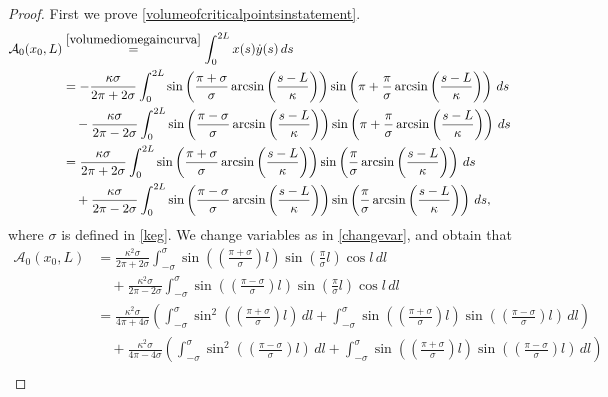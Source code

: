 \documentclass[11pt]{amsart}
\newcommand{\A}{\mathcal A}
\renewcommand{\k}{\kappa}
\theoremstyle{definition}
\theoremstyle{remark}
\numberwithin{equation}{section}
\begin{document}
\begin{proof}
First we prove \eqref{volumeofcriticalpointsinstatement}.
\begin{equation*}
	\begin{split}
		\A_0(x_0,L)&\overset{\eqref{volumediomegaincurva}}{=}\int_0^{2L} x(s)\dot y(s)\,ds\\
		&=-\frac{\k\sigma}{2\pi+2\sigma}\int_0^{2L}\sin\left(\frac{\pi+\sigma}{\sigma}\arcsin\left(\frac{s-L}{\k}\right)\right)\sin\left(\pi+\frac{\pi}{\sigma}\arcsin\left(\frac{s-L}{\k}\right)\right)\,ds\\
		&\quad-\frac{\k\sigma}{2\pi-2\sigma}\int_0^{2L}\sin\left(\frac{\pi-\sigma}{\sigma}\arcsin\left(\frac{s-L}{\k}\right)\right)\sin\left(\pi+\frac{\pi}{\sigma}\arcsin\left(\frac{s-L}{\k}\right)\right)\,ds\\
		&=\frac{\k\sigma}{2\pi+2\sigma}\int_0^{2L}\sin\left(\frac{\pi+\sigma}{\sigma}\arcsin\left(\frac{s-L}{\k}\right)\right)\sin\left(\frac{\pi}{\sigma}\arcsin\left(\frac{s-L}{\k}\right)\right)\,ds\\
		&\quad+\frac{\k\sigma}{2\pi-2\sigma}\int_0^{2L}\sin\left(\frac{\pi-\sigma}{\sigma}\arcsin\left(\frac{s-L}{\k}\right)\right)\sin\left(\frac{\pi}{\sigma}\arcsin\left(\frac{s-L}{\k}\right)\right)\,ds,\\
	\end{split}
\end{equation*}
where $\sigma$ is defined in \eqref{keg}. We change variables as in \eqref{changevar}, and obtain that
\begin{equation*}
	\begin{split}
		\A_0(x_0,L)&=\frac{\k^2\sigma}{2\pi+2\sigma}\int_{-\sigma}^\sigma   \sin\left(\left(\frac{\pi+\sigma}{\sigma}\right)l\right)\sin\left(\frac{\pi}{\sigma}l\right)\cos l\,dl\\
		&\quad+\frac{\k^2\sigma}{2\pi-2\sigma}\int_{-\sigma}^\sigma   \sin\left(\left(\frac{\pi-\sigma}{\sigma}\right)l\right)\sin\left(\frac{\pi}{\sigma}l\right)\cos l\,dl\\
		&=\frac{\k^2\sigma}{4\pi+4\sigma}\left(\int_{-\sigma}^\sigma  \sin^2\left(\left(\frac{\pi+\sigma}{\sigma}\right)l\right)\,dl+\int_{-\sigma}^\sigma   \sin\left(\left(\frac{\pi+\sigma}{\sigma}\right)l\right)\sin\left(\left(\frac{\pi-\sigma}{\sigma}\right)l\right)\,dl\right)\\
		&\quad+\frac{\k^2\sigma}{4\pi-4\sigma}\left(\int_{-\sigma}^\sigma  \sin^2\left(\left(\frac{\pi-\sigma}{\sigma}\right)l\right)\,dl+\int_{-\sigma}^\sigma   \sin\left(\left(\frac{\pi+\sigma}{\sigma}\right)l\right)\sin\left(\left(\frac{\pi-\sigma}{\sigma}\right)l\right)\,dl\right)\\

\end{split}
\end{equation*}
\end{proof}
\end{document}
